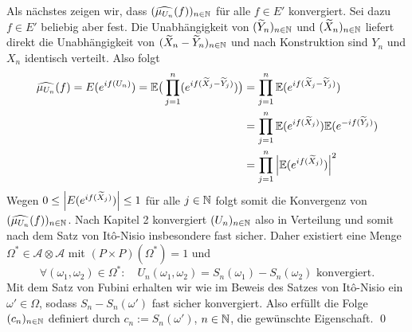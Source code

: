 \begin{proof*}
    Als nächstes zeigen wir, dass $(\widehat{\mu_{U_n}}(f))_{n \in \mathbb{N}}$ für alle $f \in E'$ konvergiert. Sei dazu $f \in E'$ beliebig aber fest. 
    Die Unabhängigkeit von $(\widetilde{Y}_n)_{n \in \mathbb{N}}$ und $(\widetilde{X}_n)_{n \in \mathbb{N}}$ liefert direkt die Unabhängigkeit von $(\widetilde{X}_n - \widetilde{Y}_n)_{n \in \mathbb{N}}$
    und nach Konstruktion sind $Y_n$ und $X_n$ identisch verteilt. Also folgt 
    \begin{align*}
        \widehat{\mu_{U_n}}(f) = E(e^{if(U_n)}) = \mathbb{E}\big(\prod_{j=1}^n(e^{if(\widetilde{X}_j-\widetilde{Y}_j)})\big) &= \prod_{j=1}^n \mathbb{E}(e^{if(\widetilde{X}_j-\widetilde{Y}_j)}) \\\ 
                                                                                                            &= \prod_{j=1}^n \mathbb{E}(e^{if(\widetilde{X}_j)})\mathbb{E}(e^{-if(\widetilde{Y}_j)}) \\\
                                                                                                            &= \prod_{j=1}^n \abs{\mathbb{E}(e^{if(\widetilde{X}_j)})}^2
    \end{align*}
    Wegen $0 \leq \left| E(e^{if(\widetilde{X}_j)}) \right| \leq 1$ für alle $j \in \mathbb{N}$ folgt somit die Konvergenz von $(\widehat{\mu_{U_n}}(f))_{n \in \mathbb{N}}$. 
    Nach Kapitel 2 konvergiert $(U_n)_{n \in \mathbb{N}}$ also in Verteilung und somit nach dem Satz von Itô-Nisio insbesondere fast sicher. 
    Daher existiert eine Menge $\Omega^* \in \mathcal{A} \otimes \mathcal{A}$ mit $(P\times P)(\Omega^*) = 1$ und 
    $$
        \forall (\omega_1, \omega_2) \in \Omega^*: \quad U_n(\omega_1, \omega_2) = S_n(\omega_1) - S_n(\omega_2) \text{ konvergiert.}
    $$
    Mit dem Satz von Fubini erhalten wir wie im Beweis des Satzes von Itô-Nisio ein $\omega' \in \Omega$, sodass $S_n - S_n(\omega')$ fast sicher konvergiert. 
    Also erfüllt die Folge $(c_n)_{n \in \mathbb{N}}$ definiert durch $c_n := S_n(\omega')$, $n \in \mathbb{N}$, die gewünschte Eigenschaft. \qed

\end{proof*}

